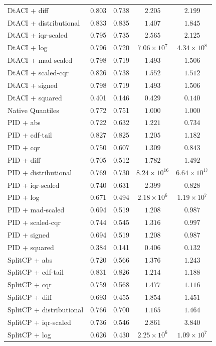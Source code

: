 \begin{longtable}{lcccc}
	DtACI + diff & 0.803 & 0.738 & $2.205$ & $2.199$ \\
	DtACI + distributional & 0.833 & 0.835 & $1.407$ & $1.845$ \\
	DtACI + iqr-scaled & 0.795 & 0.735 & $2.565$ & $2.125$ \\
	DtACI + log & 0.796 & 0.720 & $7.06 \times 10^{7}$ & $4.34 \times 10^{8}$ \\
	DtACI + mad-scaled & 0.798 & 0.719 & $1.493$ & $1.506$ \\
	DtACI + scaled-cqr & 0.826 & 0.738 & $1.552$ & $1.512$ \\
	DtACI + signed & 0.798 & 0.719 & $1.493$ & $1.506$ \\
	DtACI + squared & 0.401 & 0.146 & $0.429$ & $0.140$ \\
	Native Quantiles & 0.772 & 0.751 & $1.000$ & $1.000$ \\
	PID + abs & 0.722 & 0.632 & $1.221$ & $0.734$ \\
	PID + cdf-tail & 0.827 & 0.825 & $1.205$ & $1.182$ \\
	PID + cqr & 0.750 & 0.607 & $1.309$ & $0.843$ \\
	PID + diff & 0.705 & 0.512 & $1.782$ & $1.492$ \\
	PID + distributional & 0.769 & 0.730 & $8.24 \times 10^{16}$ & $6.64 \times 10^{17}$ \\
	PID + iqr-scaled & 0.740 & 0.631 & $2.399$ & $0.828$ \\
	PID + log & 0.671 & 0.494 & $2.18 \times 10^{6}$ & $1.19 \times 10^{7}$ \\
	PID + mad-scaled & 0.694 & 0.519 & $1.208$ & $0.987$ \\
	PID + scaled-cqr & 0.744 & 0.545 & $1.316$ & $0.997$ \\
	PID + signed & 0.694 & 0.519 & $1.208$ & $0.987$ \\
	PID + squared & 0.384 & 0.141 & $0.406$ & $0.132$ \\
	SplitCP + abs & 0.720 & 0.566 & $1.376$ & $1.243$ \\
	SplitCP + cdf-tail & 0.831 & 0.826 & $1.214$ & $1.188$ \\
	SplitCP + cqr & 0.759 & 0.568 & $1.477$ & $1.116$ \\
	SplitCP + diff & 0.693 & 0.455 & $1.854$ & $1.451$ \\
	SplitCP + distributional & 0.766 & 0.700 & $1.165$ & $1.464$ \\
	SplitCP + iqr-scaled & 0.736 & 0.546 & $2.861$ & $3.840$ \\
	SplitCP + log & 0.626 & 0.430 & $2.25 \times 10^{6}$ & $1.09 \times 10^{7}$ \\

\end{longtable}
